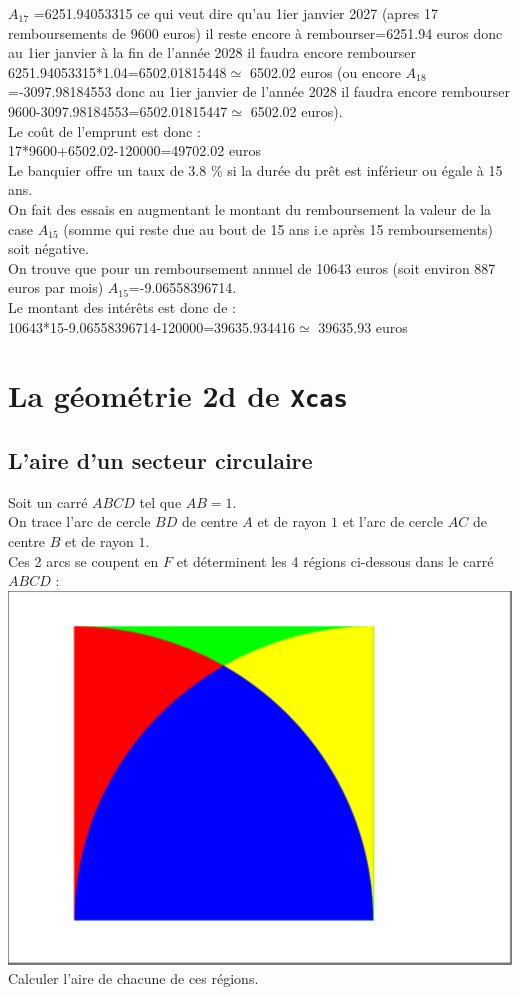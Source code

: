 \documentclass[a4paper,11pt]{book}
\begin{document}
$A_{17}$ =6251.94053315 ce qui veut dire qu'au 1ier janvier 2027 (apres 17 
remboursements de 9600 euros) il reste
encore \`a rembourser=6251.94 euros donc au 1ier janvier \`a la fin
 de l'ann\'ee 2028 il faudra encore rembourser 6251.94053315*1.04=6502.01815448$\simeq$ 6502.02 euros (ou 
encore $A_{18}$ =-3097.98184553 donc au 1ier janvier de l'ann\'ee 2028 il faudra
 encore rembourser 9600-3097.98184553=6502.01815447$\simeq$ 6502.02 euros).\\
Le co\^ut de l'emprunt est donc :\\
17*9600+6502.02-120000=49702.02 euros\\
Le banquier offre un taux de 3.8 \% si la dur\'ee du pr\^et est inf\'erieur 
ou \'egale \`a 15 ans.\\
On fait des essais en augmentant le montant du remboursement la valeur de la 
case $A_{15}$ (somme qui reste due au bout de 15 ans i.e apr\`es 15 
remboursements) soit n\'egative.\\
On trouve que pour un remboursement annuel de 10643 euros (soit environ 887 
euros par mois)
$A_{15}$=-9.06558396714.\\
Le montant des int\'er\^ets est donc de :\\
10643*15-9.06558396714-120000=39635.934416$\simeq$ 39635.93 euros
\section{La g\'eom\'etrie 2d de {\tt Xcas}}
\subsection{L'aire d'un secteur circulaire}
Soit un carr\'e $ABCD$ tel que $AB=1$.\\
On trace l'arc de cercle $BD$ de centre $A$ et de rayon $1$
et l'arc de cercle $AC$ de centre $B$ et de rayon $1$.\\
Ces 2 arcs se coupent en $F$ et d\'eterminent les 4 r\'egions ci-dessous dans 
le carr\'e $ABCD$ :\\
\includegraphics[width=\textwidth]{airearc}\\
Calculer l'aire de chacune de ces r\'egions.\\ 
\end{document}
